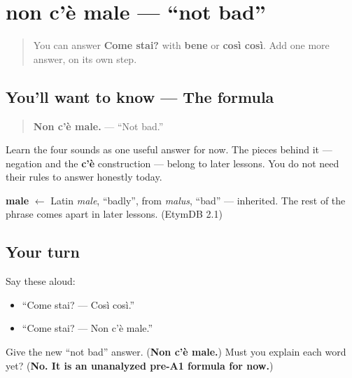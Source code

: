 \section[non c'è male]{non c'è male — \textquotedblleft{}not bad\textquotedblright{}}

\label{lesson:IT-C02-non-ce-male}



\begin{quote}
You can answer \textbf{Come stai?} with \textbf{bene} or \textbf{così così}. Add one more answer, on its own step.
\end{quote}

\subsection*{You'll want to know — The formula}
\begin{quote}
\textbf{Non c'è male.} — \textquotedblleft{}Not bad.\textquotedblright{}
\end{quote}

Learn the four sounds as one useful answer for now. The pieces behind it — negation and the \textbf{c'è} construction — belong to later lessons. You do not need their rules to answer honestly today.

\begin{cousinweb}
\textbf{male} $\leftarrow$ Latin \emph{male}, \textquotedblleft{}badly\textquotedblright{}, from \emph{malus}, \textquotedblleft{}bad\textquotedblright{} — inherited. The rest of the phrase comes apart in later lessons. (EtymDB 2.1)
\end{cousinweb}

\subsection*{Your turn}
Say these aloud:

\begin{itemize}
\raggedright
  \item \textquotedblleft{}Come stai? — Così così.\textquotedblright{}
  \item \textquotedblleft{}Come stai? — Non c'è male.\textquotedblright{}
\end{itemize}

\begin{tcolorbox}[breakable,colback=teal!4,colframe=teal!35!black,title={Before you move on}]
Give the new \textquotedblleft{}not bad\textquotedblright{} answer. (\textbf{Non c'è male.}) Must you explain each word yet? (\textbf{No. It is an unanalyzed pre-A1 formula for now.})
\end{tcolorbox}
